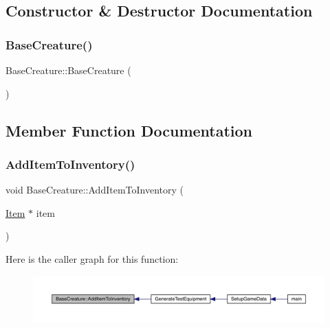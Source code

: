 \subsection{Constructor \& Destructor Documentation}
\mbox{\label{class_base_creature_aed503a9552a9d28233012f7a7b74d9bc}} 
\subsubsection{\texorpdfstring{Base\+Creature()}{BaseCreature()}}
{\footnotesize\ttfamily Base\+Creature\+::\+Base\+Creature (\begin{DoxyParamCaption}{ }\end{DoxyParamCaption})}



\subsection{Member Function Documentation}
\mbox{\label{class_base_creature_ab6f0139afb4e1b15d5f1feecc267580d}} 
\subsubsection{\texorpdfstring{Add\+Item\+To\+Inventory()}{AddItemToInventory()}}
{\footnotesize\ttfamily void Base\+Creature\+::\+Add\+Item\+To\+Inventory (\begin{DoxyParamCaption}\item[{\mbox{\hyperlink{class_item}{Item}} $\ast$}]{item }\end{DoxyParamCaption})}

Here is the caller graph for this function\+:
\nopagebreak
\begin{figure}[H]
\begin{center}
\leavevmode
\includegraphics[width=350pt]{class_base_creature_ab6f0139afb4e1b15d5f1feecc267580d_icgraph}
\end{center}
\end{figure}
\mbox{\label{class_base_creature_aa18f395754df39095f993e6805ef37a8}} 

